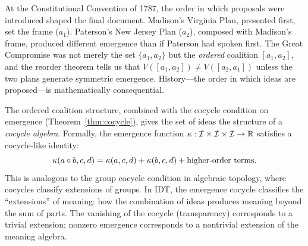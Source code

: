 \begin{example}
At the Constitutional Convention of 1787, the order in which proposals
were introduced shaped the final document. Madison's Virginia Plan,
presented first, set the frame ($a_1$). Paterson's New Jersey Plan
($a_2$), composed with Madison's frame, produced different emergence
than if Paterson had spoken first. The Great Compromise was not merely
the set $\{a_1, a_2\}$ but the \emph{ordered} coalition $[a_1, a_2]$,
and the reorder theorem tells us that $V([a_1, a_2]) \neq V([a_2, a_1])$
unless the two plans generate symmetric emergence. History---the order
in which ideas are proposed---is mathematically consequential.
\end{example}

\begin{remark}
The ordered coalition structure, combined with the cocycle condition
on emergence (Theorem~\ref{thm:cocycle}), gives the set of ideas the
structure of a \emph{cocycle algebra}. Formally, the emergence function
$\kappa : \mathcal{I} \times \mathcal{I} \times \mathcal{I} \to \mathbb{R}$ satisfies a cocycle-like
identity:
\[
\kappa(a \circ b, c, d) = \kappa(a, c, d) + \kappa(b, c, d)
+ \text{higher-order terms}.
\]
This is analogous to the group cocycle condition in algebraic topology,
where cocycles classify extensions of groups. In IDT, the emergence
cocycle classifies the ``extensions'' of meaning: how the combination
of ideas produces meaning beyond the sum of parts. The vanishing of
the cocycle (transparency) corresponds to a trivial extension; nonzero
emergence corresponds to a nontrivial extension of the meaning algebra.
\end{remark}

